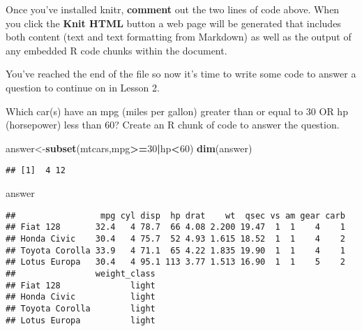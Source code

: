 \documentclass[]{article}
\newenvironment{Shaded}{\begin{snugshade}}{\end{snugshade}}
\newcommand{\KeywordTok}[1]{\textcolor[rgb]{0.13,0.29,0.53}{\textbf{#1}}}
\newcommand{\DecValTok}[1]{\textcolor[rgb]{0.00,0.00,0.81}{#1}}
\newcommand{\OperatorTok}[1]{\textcolor[rgb]{0.81,0.36,0.00}{\textbf{#1}}}
\newcommand{\NormalTok}[1]{#1}
\begin{document}
Once you've installed knitr, \textbf{comment} out the two lines of code
above. When you click the \textbf{Knit HTML} button a web page will be
generated that includes both content (text and text formatting from
Markdown) as well as the output of any embedded R code chunks within the
document.

You've reached the end of the file so now it's time to write some code
to answer a question to continue on in Lesson 2.

Which car(s) have an mpg (miles per gallon) greater than or equal to 30
OR hp (horsepower) less than 60? Create an R chunk of code to answer the
question.

\begin{Shaded}
\begin{Highlighting}[]
\NormalTok{answer<-}\KeywordTok{subset}\NormalTok{(mtcars,mpg}\OperatorTok{>=}\DecValTok{30}\OperatorTok{|}\NormalTok{hp}\OperatorTok{<}\DecValTok{60}\NormalTok{)}
\KeywordTok{dim}\NormalTok{(answer)}
\end{Highlighting}
\end{Shaded}

\begin{verbatim}
## [1]  4 12
\end{verbatim}

\begin{Shaded}
\begin{Highlighting}[]
\NormalTok{answer}
\end{Highlighting}
\end{Shaded}

\begin{verbatim}
##                 mpg cyl disp  hp drat    wt  qsec vs am gear carb
## Fiat 128       32.4   4 78.7  66 4.08 2.200 19.47  1  1    4    1
## Honda Civic    30.4   4 75.7  52 4.93 1.615 18.52  1  1    4    2
## Toyota Corolla 33.9   4 71.1  65 4.22 1.835 19.90  1  1    4    1
## Lotus Europa   30.4   4 95.1 113 3.77 1.513 16.90  1  1    5    2
##                weight_class
## Fiat 128              light
## Honda Civic           light
## Toyota Corolla        light
## Lotus Europa          light
\end{verbatim}

\begin{Shaded}
\end{Shaded}
\end{document}
